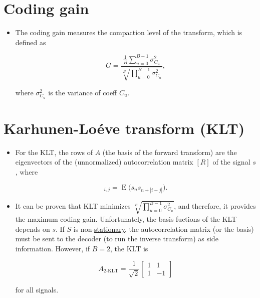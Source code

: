 \section{Coding gain}
\begin{itemize}
\item
  The coding gain measures the compaction level of the transform, which
  is defined as

  \begin{equation}
    G=\frac{\frac{1}{B}\displaystyle\sum_{u=0}^{B-1}\sigma_{C_u}^2}{\sqrt[B]{\displaystyle\prod_{u=0}^{B-1}\sigma_{C_u}^2}},
  \end{equation}

  where \(\sigma_{C_u}^2\) is the variance of coeff \(C_u\).
\end{itemize}

\section{Karhunen-Loéve transform (KLT)}
\begin{itemize}
\item
  For the KLT, the rows of \(A\) (the basis of the forward transform)
  are the eigenvectors of the (unnormalized) autocorrelation matrix
  \([R]\) of the signal \(s\), where

  \begin{equation}
    [R]_{i,j} = \operatorname{E}\big(s_ns_{n+|i-j|}\big).
  \end{equation}
\item
  It can be proven that KLT minimizes
  \(\sqrt[B]{\prod_{u=0}^{B-1}\sigma_{C_u}^2}\), and therefore, it
  provides the maximum coding gain. Unfortunately, the basis fuctions of
  the KLT depends on \(s\). If \(S\) is
  non-\href{https://en.wikipedia.org/wiki/Stationary_process}{stationary},
  the autocorrelation matrix (or the basis) must be sent to the decoder
  (to run the inverse transform) as side information. However, if
  \(B=2\), the KLT is

  \begin{equation}
    A_{\text{2-KLT}} = \frac{1}{\sqrt{2}}
    \left[
      \begin{array}{cc}
        1 & 1 \\
        1 & -1
      \end{array}
    \right]
  \end{equation}

  for all signals.
\end{itemize}


